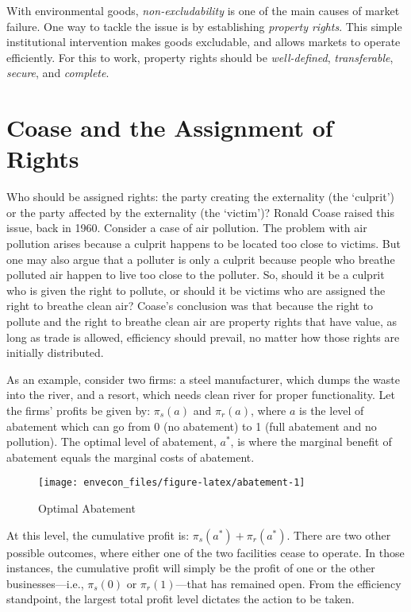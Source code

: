 \documentclass[
]{book}
\begin{document}
With environmental goods, \emph{non-excludability} is one of the main causes of market failure. One way to tackle the issue is by establishing \emph{property rights}. This simple institutional intervention makes goods excludable, and allows markets to operate efficiently. For this to work, property rights should be \emph{well-defined}, \emph{transferable}, \emph{secure}, and \emph{complete}.

\hypertarget{coase-and-the-assignment-of-rights}{%
\section{Coase and the Assignment of Rights}\label{coase-and-the-assignment-of-rights}}

Who should be assigned rights: the party creating the externality (the `culprit') or the party affected by the externality (the `victim')? Ronald Coase raised this issue, back in 1960. Consider a case of air pollution. The problem with air pollution arises because a culprit happens to be located too close to victims. But one may also argue that a polluter is only a culprit because people who breathe polluted air happen to live too close to the polluter. So, should it be a culprit who is given the right to pollute, or should it be victims who are assigned the right to breathe clean air? Coase's conclusion was that because the right to pollute and the right to breathe clean air are property rights that have value, as long as trade is allowed, efficiency should prevail, no matter how those rights are initially distributed.

As an example, consider two firms: a steel manufacturer, which dumps the waste into the river, and a resort, which needs clean river for proper functionality. Let the firms' profits be given by: \(\pi_s(a)\) and \(\pi_r(a)\), where \(a\) is the level of abatement which can go from 0 (no abatement) to 1 (full abatement and no pollution). The optimal level of abatement, \(a^*\), is where the marginal benefit of abatement equals the marginal costs of abatement.

\begin{figure}

{\centering \texttt{[image: envecon\_files/figure-latex/abatement-1]} 

}

\caption{Optimal Abatement}\label{fig:abatement}
\end{figure}

At this level, the cumulative profit is: \(\pi_s(a^*)+\pi_r(a^*)\). There are two other possible outcomes, where either one of the two facilities cease to operate. In those instances, the cumulative profit will simply be the profit of one or the other businesses---i.e., \(\pi_s(0)\) or \(\pi_r(1)\)---that has remained open. From the efficiency standpoint, the largest total profit level dictates the action to be taken.
\end{document}
